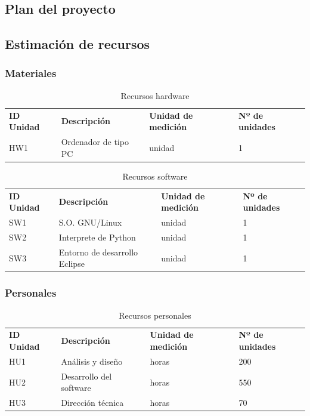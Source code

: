 
\subsection{Plan del proyecto}

\subsection{Estimación de recursos}

\subsubsection{Materiales}

\begin{table}[H]
 \begin{center}
  \begin{tabular}{llll}
	\textbf{ID Unidad} & \textbf{Descripción} & \textbf{Unidad de medición} & \textbf{Nº de unidades} \\
	HW1 & Ordenador de tipo PC & unidad & 1
  \end{tabular}
  \caption{Recursos hardware}
 \end{center}
\end{table}

\begin{table}[H]
 \begin{center}
  \begin{tabular}{llll}
	\textbf{ID Unidad} & \textbf{Descripción} & \textbf{Unidad de medición} & \textbf{Nº de unidades} \\
	SW1 & S.O. GNU/Linux & unidad & 1 \\
	SW2 & Interprete de Python & unidad & 1 \\
	SW3 & Entorno de desarrollo Eclipse & unidad & 1 
  \end{tabular}
  \caption{Recursos software}
 \end{center}
\end{table}

\subsubsection{Personales}

\begin{table}[H]
 \begin{center}
  \begin{tabular}{llll}
	\textbf{ID Unidad} & \textbf{Descripción} & \textbf{Unidad de medición} & \textbf{Nº de unidades} \\
	HU1 & Análisis y diseño & horas & 200 \\
	HU2 & Desarrollo del software & horas & 550 \\
	HU3 & Dirección técnica & horas & 70 
  \end{tabular}
  \caption{Recursos personales}
 \end{center}
\end{table}

